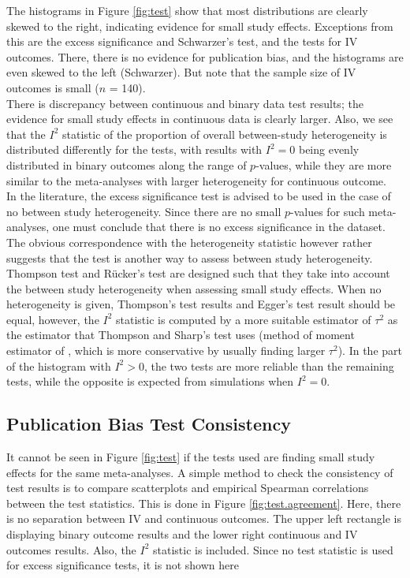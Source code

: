 \documentclass[11pt,a4paper,twoside]{book}\usepackage[]{graphicx}\usepackage[]{color}
\begin{document}
The histograms in Figure \ref{fig:test} show that most distributions are clearly skewed to the right, indicating evidence for small study effects. Exceptions from this are the excess significance and Schwarzer's test, and the tests for IV outcomes. There, there is no evidence for publication bias, and the histograms are even skewed to the left (Schwarzer). But note that the sample size of IV outcomes is small ($n$ = 140). \\
There is discrepancy between continuous and binary data test results; the evidence for small study effects in continuous data is clearly larger. Also, we see that the $I^2$ statistic of the proportion of overall between-study heterogeneity is distributed differently for the tests, with results with $I^2 = 0$ being evenly distributed in binary outcomes along the range of $p$-values, while they are more similar to the meta-analyses with larger heterogeneity for continuous outcome.\\
In the literature, the excess significance test is advised to be used in the case of no between study heterogeneity. Since there are no small $p$-values for such meta-analyses, one must conclude that there is no excess significance in the dataset. The obvious correspondence with the heterogeneity statistic however rather suggests that the test is another way to assess between study heterogeneity. Thompson test and R\"ucker's test are designed such that they take into account the between study heterogeneity when assessing small study effects. When no heterogeneity is given, Thompson's test results and Egger's test result should be equal, however, the $I^2$ statistic is computed by a more suitable estimator \citep{paulemandel} of $\tau^2$ as the estimator that Thompson and Sharp's test uses (method of moment estimator of \citet{tau.estimator}, which is more conservative by usually finding larger $\tau^2$). In the part of the histogram with $I^2 > 0$, the two tests are more reliable than the remaining tests, while the opposite is expected from simulations \citep{limitmeta} when $I^2 = 0$.\\


\subsection{Publication Bias Test Consistency}
It cannot be seen in Figure \ref{fig:test} if the tests used are finding small study effects for the same meta-analyses. A simple method to check the consistency of test results is to compare scatterplots and empirical Spearman correlations between the test statistics. This is done in Figure \ref{fig:test.agreement}. Here, there is no separation between IV and continuous outcomes. The upper left rectangle is displaying binary outcome results and the lower right continuous and IV outcomes results. Also, the $I^2$ statistic is included. Since no test statistic is used for excess significance tests, it is not shown here
\end{document}
